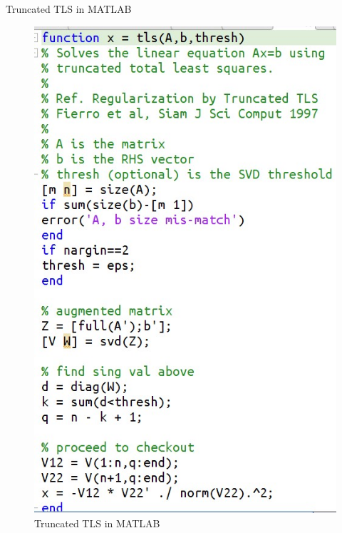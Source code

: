 \documentclass[handout]{beamer}
\begin{document}
\begin{frame}{Truncated TLS in MATLAB}
\begin{figure}
\centering
\includegraphics[scale=0.2, angle= 0]{ttls.jpg}			
\caption{Truncated TLS in MATLAB}
\end{figure}
\end{frame}
%
\end{document}
